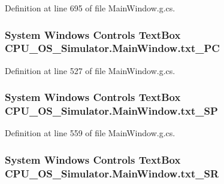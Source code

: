 Definition at line 695 of file Main\+Window.\+g.\+cs.

\hypertarget{class_c_p_u___o_s___simulator_1_1_main_window_a7100765f8e26fa4c97a76dd445942b97}{}
\subsubsection[{txt\+\_\+\+P\+C}]{\setlength{\rightskip}{0pt plus 5cm}System Windows Controls Text\+Box C\+P\+U\+\_\+\+O\+S\+\_\+\+Simulator.\+Main\+Window.\+txt\+\_\+\+P\+C\hspace{0.3cm}{\ttfamily [package]}}\label{class_c_p_u___o_s___simulator_1_1_main_window_a7100765f8e26fa4c97a76dd445942b97}


Definition at line 527 of file Main\+Window.\+g.\+cs.

\hypertarget{class_c_p_u___o_s___simulator_1_1_main_window_ac2427655774b9ca2b4c368651d5cd9de}{}
\subsubsection[{txt\+\_\+\+S\+P}]{\setlength{\rightskip}{0pt plus 5cm}System Windows Controls Text\+Box C\+P\+U\+\_\+\+O\+S\+\_\+\+Simulator.\+Main\+Window.\+txt\+\_\+\+S\+P\hspace{0.3cm}{\ttfamily [package]}}\label{class_c_p_u___o_s___simulator_1_1_main_window_ac2427655774b9ca2b4c368651d5cd9de}


Definition at line 559 of file Main\+Window.\+g.\+cs.

\hypertarget{class_c_p_u___o_s___simulator_1_1_main_window_a9135c01bacd48e517d7cf46f69ea87d2}{}
\subsubsection[{txt\+\_\+\+S\+R}]{\setlength{\rightskip}{0pt plus 5cm}System Windows Controls Text\+Box C\+P\+U\+\_\+\+O\+S\+\_\+\+Simulator.\+Main\+Window.\+txt\+\_\+\+S\+R\hspace{0.3cm}{\ttfamily [package]}}\label{class_c_p_u___o_s___simulator_1_1_main_window_a9135c01bacd48e517d7cf46f69ea87d2}


